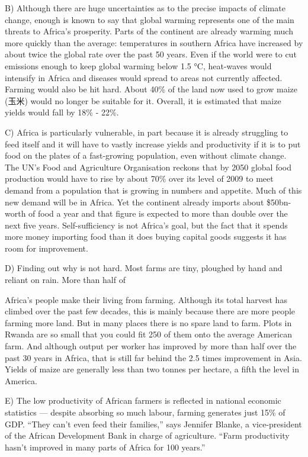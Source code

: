 \documentclass[UTF8,11pt]{ctexart}
\begin{document}
B) Although there are huge uncertainties as to the precise impacts of climate change, enough is known to say that global warming represents one of the main threats to Africa’s prosperity. Parts of the continent are already warming much more quickly than the average: temperatures in southern Africa have increased by about twice the global rate over the past 50 years. Even if the world were to cut emissions enough to keep global warming below 1.5 °C, heat-waves would intensify in Africa and diseases would spread to areas not currently affected. Farming would also be hit hard. About 40\% of the land now used to grow maize (玉米) would no longer be suitable for it. Overall, it is estimated that maize yields would fall by 18\% - 22\%.


C) Africa is particularly vulnerable, in part because it is already struggling to feed itself and it will have to vastly increase yields and productivity if it is to put food on the plates of a fast-growing population, even without climate change. The UN’s Food and Agriculture Organisation reckons that by 2050 global food production would have to rise by about 70\% over its level of 2009 to meet demand from a population that is growing in numbers and appetite. Much of this new demand will be in Africa. Yet the continent already imports about \$50bn-worth of food a year and that figure is expected to more than double over the next five years. Self-sufficiency is not Africa’s goal, but the fact that it spends more money importing food than it does buying capital goods suggests it has room for improvement.


D) Finding out why is not hard. Most farms are tiny, ploughed by hand and reliant on rain. More than half of


Africa’s people make their living from farming. Although its total harvest has climbed over the past few decades, this is mainly because there are more people farming more land. But in many places there is no spare land to farm. Plots in Rwanda are so small that you could fit 250 of them onto the average American farm. And although output per worker has improved by more than half over the past 30 years in Africa, that is still far behind the 2.5 times improvement in Asia. Yields of maize are generally less than two tonnes per hectare, a fifth the level in America.


E) The low productivity of African farmers is reflected in national economic statistics — despite absorbing so much labour, farming generates just 15\% of GDP. “They can’t even feed their families,” says Jennifer Blanke, a vice-president of the African Development Bank in charge of agriculture. “Farm productivity hasn’t improved in many parts of Africa for 100 years.”
\end{document}
